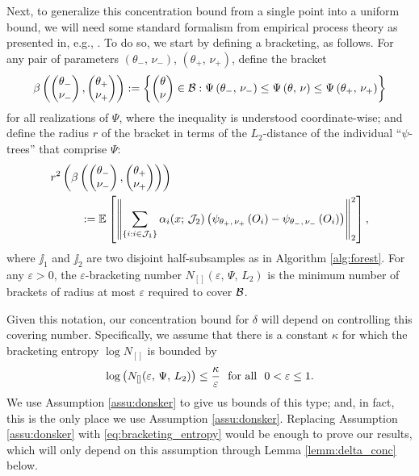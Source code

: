 \documentclass[aos]{imsart}
\theoremstyle{plain}
\theoremstyle{definition}
\theoremstyle{remark}
\begin{document}
\begin{CJK}{UTF8}{gbsn}
\begin{appendix}
Next, to generalize this concentration bound from a single point into a uniform bound,
we will need some standard formalism from empirical process theory
as presented in, e.g., \citet{van1996weak}. To do so, we start by defining a
bracketing, as follows. For any pair of parameters $(\theta_{-}, \, \nu_{-})$,
$(\theta_{+}, \, \nu_{+})$, define the bracket
$$ \beta\p{\begin{pmatrix} \theta_{-} \\ \nu_{-} \end{pmatrix},
\begin{pmatrix} \theta_{+} \\ \nu_{+} \end{pmatrix}}
: = \cb{\begin{pmatrix} \theta \\ \nu \end{pmatrix} \in \bb : 
\Psi\p{\theta_{-}, \, \nu_{-}}
\leq \Psi\p{\theta, \, \nu}
\leq \Psi\p{\theta_{+}, \, \nu_{+}}} $$
for all realizations of $\Psi$, where the inequality is
understood coordinate-wise; and define the radius $r$
of the bracket in terms of the $L_2$-distance of the individual ``$\psi$-trees''
that comprise $\Psi$:
\begin{equation}
\label{eq:bracketing_radius}
\begin{split}
&r^2\p{\beta\p{\begin{pmatrix} \theta_{-} \\ \nu_{-} \end{pmatrix},
\begin{pmatrix} \theta_{+} \\ \nu_{+} \end{pmatrix}}} \\
&\ \ \ \ \ \ \ \
:= \EE{\Norm{\sum_{\cb{i : i \in \jj_1}} \alpha_i(x; \, \jj_2) \p{\psi_{\theta_+, \, \nu_+}\p{O_i} - \psi_{\theta_-, \, \nu_-}\p{O_i}}}_2^2},
\end{split}
\end{equation}
where $\jj_1$ and $\jj_2$ are two disjoint half-subsamples as in Algorithm \ref{alg:forest}.
For any $\varepsilon > 0$, the $\varepsilon$-bracketing number
$N_{[]}(\varepsilon, \, \Psi, \, L_2)$ is the minimum number of brackets of
radius at most $\varepsilon$ required to cover $\mathcal{B}$.

Given this notation, our concentration bound for $\delta$ will depend
on controlling this covering number. Specifically, we assume that there is a
constant $\kappa$ for which the bracketing entropy $\log N_{[]}$ is bounded by
\begin{equation}
\label{eq:bracketing_entropy}
\log\p{N_{[]}(\varepsilon, \, \Psi, \, L_2)} \leq \frac{\kappa}{\varepsilon} \ \text{ for all } \ 0 < \varepsilon \leq 1.
\end{equation}
We use Assumption \ref{assu:donsker} to give us bounds of this type; and, in fact,
this is the only place we use Assumption \ref{assu:donsker}. Replacing Assumption
\ref{assu:donsker} with \eqref{eq:bracketing_entropy} would be enough to prove our results,
which will only depend on this assumption through Lemma \ref{lemm:delta_conc} below.


\end{appendix}
\end{CJK}
\end{document}
